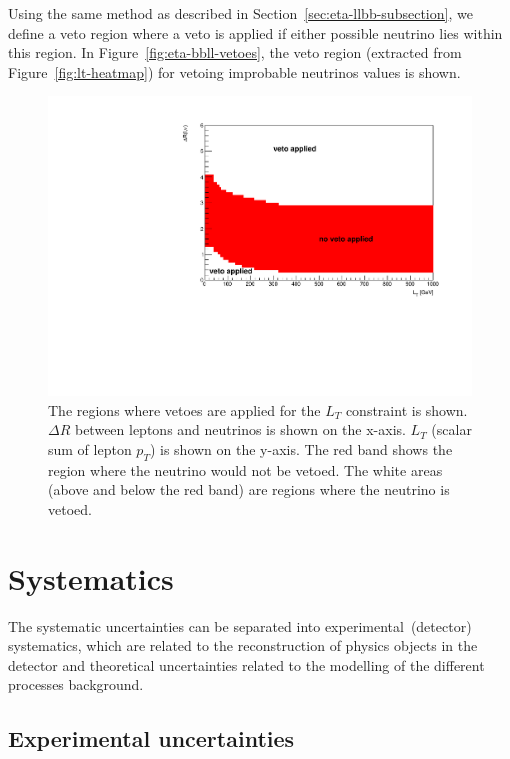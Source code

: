 Using the same method as described in Section~\ref{sec:eta-llbb-subsection}, we define a veto region where a veto is applied if either possible neutrino lies within this region.
In Figure~\ref{fig:eta-bbll-vetoes}, the veto region (extracted from Figure~\ref{fig:lt-heatmap}) for vetoing improbable neutrinos values is shown.
\begin{figure}[h!]
	\includegraphics[scale=0.8]{figures/lt_veto_2vSM.pdf}
	\centering
	\caption{The regions where vetoes are applied for the $L_{T}$ constraint is shown. $\Delta R$ between leptons and neutrinos is shown on the x-axis. $L_{T}$ (scalar sum of lepton $p_{T}$) is shown on the y-axis. The red band shows the region where the neutrino would not be vetoed. The white areas (above and below the red band) are regions where the neutrino is vetoed.}
	\label{fig:lt-vetoes}
\end{figure}


\section{Systematics}
\label{sec:systematics}

The systematic uncertainties can be separated into experimental~(detector) systematics, which are related to the reconstruction of physics objects in the detector and theoretical uncertainties related to the modelling of the different processes background.

\subsection{Experimental uncertainties}
\label{subsec:syst_exp}

